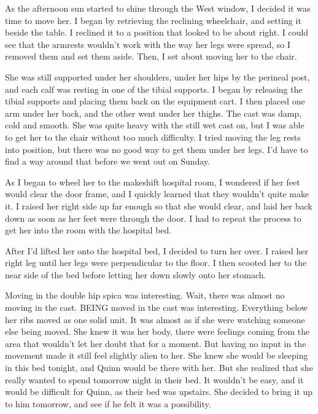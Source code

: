 As the afternoon sun started to shine through the West window, I decided it was time to
move her. I began by retrieving the reclining wheelchair, and setting it beside the table. I
reclined it to a position that looked to be about right. I could see that the armrests wouldn't
work with the way her legs were spread, so I removed them and set them aside. Then, I set about
moving her to the chair.

She was still supported under her shoulders, under her hips by the perineal post, and each
calf was resting in one of the tibial supports. I began by releasing the tibial supports and
placing them back on the equipment cart. I then placed one arm under her back, and the other
went under her thighs. The cast was damp, cold and smooth. She was quite heavy with the still
wet cast on, but I was able to get her to the chair without too much difficulty. I tried moving
the leg rests into position, but there was no good way to get them under her legs. I'd have to
find a way around that before we went out on Sunday.

As I began to wheel her to the makeshift hospital room, I wondered if her feet would clear
the door frame, and I quickly learned that they wouldn't quite make it. I raised her right side
up far enough so that she would clear, and laid her back down as soon as her feet were through
the door. I had to repeat the process to get her into the room with the hospital bed.

After I'd lifted her onto the hospital bed, I decided to turn her over. I raised her right
leg until her legs were perpendicular to the floor. I then scooted her to the near side of the
bed before letting her down slowly onto her stomach.

\begin{thought}
Moving in the double hip spica was interesting. Wait, there was almost no moving in the
cast. BEING moved in the cast was interesting. Everything below her ribs moved as one solid
unit. It was almost as if she were watching someone else being moved. She knew it was her body,
there were feelings coming from the area that wouldn't let her doubt that for a moment. But
having no input in the movement made it still feel slightly alien to her. She knew she would be
sleeping in this bed tonight, and Quinn would be there with her. But she realized that she
really wanted to spend tomorrow night in their bed. It wouldn't be easy, and it would be
difficult for Quinn, as their bed was upstairs. She decided to bring it up to him tomorrow, and
see if he felt it was a possibility.
\end{thought}

